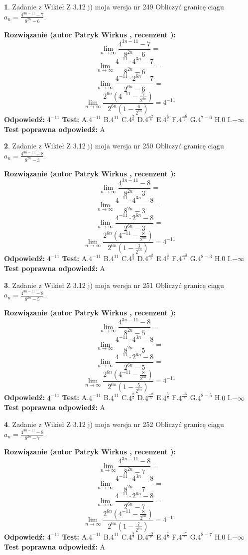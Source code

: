 \documentclass[12pt, a4paper]{article}
\theoremstyle{definition} %
\newtheorem{zad}{}
\newcommand{\zadStart}[1]{\begin{zad}#1\newline}
\newcommand{\zadStop}{\end{zad}}
\newcommand{\rozwStart}[2]{\noindent \textbf{Rozwiązanie (autor #1 , recenzent #2): }\newline}
\newcommand{\rozwStop}{\newline}
\newcommand{\odpStart}{\noindent \textbf{Odpowiedź:}\newline}
\newcommand{\odpStop}{\newline}
\newcommand{\testStart}{\noindent \textbf{Test:}\newline}
\newcommand{\testStop}{\newline}
\newcommand{\kluczStart}{\noindent \textbf{Test poprawna odpowiedź:}\newline}
\newcommand{\kluczStop}{\newline}
\begin{document}
\zadStart{Zadanie z Wikieł Z 3.12 j) moja wersja nr 249}
Obliczyć granicę ciągu $a_{n}=\frac{4^{3n-11}-7}{8^{2n}-6}$.
\zadStop
\rozwStart{Patryk Wirkus}{}
$$\lim\limits_{n\to\infty}\frac{4^{3n-11}-7}{8^{2n}-6}=$$
$$\lim\limits_{n\to\infty}\frac{4^{-11} \cdot 4^{3n}-7}{8^{2n}-6}=$$
$$\lim\limits_{n\to\infty}\frac{4^{-11} \cdot 2^{6n}-7}{2^{6n}-6}=$$
$$\lim\limits_{n\to\infty}\frac{2^{6n}(4^{-11} - \frac{7}{2^{6n}})}{2^{6n}(1-\frac{6}{2^{6n}})}= 4^{-11}$$
\rozwStop
\odpStart
$4^{-11}$
\odpStop
\testStart
A.$4^{-11}$
B.$4^{11}$
C.$4^{\frac{7}{6}}$
D.$4^{\frac{-7}{6}}$
E.$4^{\frac{6}{7}}$
F.$4^{\frac{-6}{7}}$
G.$4^{7-6}$
H.$0$
I.$-\infty$
\testStop
\kluczStart
A
\kluczStop



\zadStart{Zadanie z Wikieł Z 3.12 j) moja wersja nr 250}
Obliczyć granicę ciągu $a_{n}=\frac{4^{3n-11}-8}{8^{2n}-3}$.
\zadStop
\rozwStart{Patryk Wirkus}{}
$$\lim\limits_{n\to\infty}\frac{4^{3n-11}-8}{8^{2n}-3}=$$
$$\lim\limits_{n\to\infty}\frac{4^{-11} \cdot 4^{3n}-8}{8^{2n}-3}=$$
$$\lim\limits_{n\to\infty}\frac{4^{-11} \cdot 2^{6n}-8}{2^{6n}-3}=$$
$$\lim\limits_{n\to\infty}\frac{2^{6n}(4^{-11} - \frac{8}{2^{6n}})}{2^{6n}(1-\frac{3}{2^{6n}})}= 4^{-11}$$
\rozwStop
\odpStart
$4^{-11}$
\odpStop
\testStart
A.$4^{-11}$
B.$4^{11}$
C.$4^{\frac{8}{3}}$
D.$4^{\frac{-8}{3}}$
E.$4^{\frac{3}{8}}$
F.$4^{\frac{-3}{8}}$
G.$4^{8-3}$
H.$0$
I.$-\infty$
\testStop
\kluczStart
A
\kluczStop



\zadStart{Zadanie z Wikieł Z 3.12 j) moja wersja nr 251}
Obliczyć granicę ciągu $a_{n}=\frac{4^{3n-11}-8}{8^{2n}-5}$.
\zadStop
\rozwStart{Patryk Wirkus}{}
$$\lim\limits_{n\to\infty}\frac{4^{3n-11}-8}{8^{2n}-5}=$$
$$\lim\limits_{n\to\infty}\frac{4^{-11} \cdot 4^{3n}-8}{8^{2n}-5}=$$
$$\lim\limits_{n\to\infty}\frac{4^{-11} \cdot 2^{6n}-8}{2^{6n}-5}=$$
$$\lim\limits_{n\to\infty}\frac{2^{6n}(4^{-11} - \frac{8}{2^{6n}})}{2^{6n}(1-\frac{5}{2^{6n}})}= 4^{-11}$$
\rozwStop
\odpStart
$4^{-11}$
\odpStop
\testStart
A.$4^{-11}$
B.$4^{11}$
C.$4^{\frac{8}{5}}$
D.$4^{\frac{-8}{5}}$
E.$4^{\frac{5}{8}}$
F.$4^{\frac{-5}{8}}$
G.$4^{8-5}$
H.$0$
I.$-\infty$
\testStop
\kluczStart
A
\kluczStop



\zadStart{Zadanie z Wikieł Z 3.12 j) moja wersja nr 252}
Obliczyć granicę ciągu $a_{n}=\frac{4^{3n-11}-8}{8^{2n}-7}$.
\zadStop
\rozwStart{Patryk Wirkus}{}
$$\lim\limits_{n\to\infty}\frac{4^{3n-11}-8}{8^{2n}-7}=$$
$$\lim\limits_{n\to\infty}\frac{4^{-11} \cdot 4^{3n}-8}{8^{2n}-7}=$$
$$\lim\limits_{n\to\infty}\frac{4^{-11} \cdot 2^{6n}-8}{2^{6n}-7}=$$
$$\lim\limits_{n\to\infty}\frac{2^{6n}(4^{-11} - \frac{8}{2^{6n}})}{2^{6n}(1-\frac{7}{2^{6n}})}= 4^{-11}$$
\rozwStop
\odpStart
$4^{-11}$
\odpStop
\testStart
A.$4^{-11}$
B.$4^{11}$
C.$4^{\frac{8}{7}}$
D.$4^{\frac{-8}{7}}$
E.$4^{\frac{7}{8}}$
F.$4^{\frac{-7}{8}}$
G.$4^{8-7}$
H.$0$
I.$-\infty$
\testStop
\kluczStart
A
\kluczStop
\end{document}
